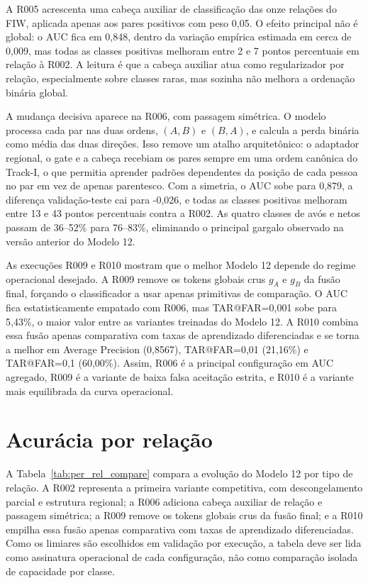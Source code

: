 A R005 acrescenta uma cabeça auxiliar de classificação das onze relações do FIW, aplicada apenas aos pares positivos com peso 0,05. O efeito principal não é global: o AUC fica em 0,848, dentro da variação empírica estimada em cerca de 0,009, mas todas as classes positivas melhoram entre 2 e 7 pontos percentuais em relação à R002. A leitura é que a cabeça auxiliar atua como regularizador por relação, especialmente sobre classes raras, mas sozinha não melhora a ordenação binária global.

A mudança decisiva aparece na R006, com passagem simétrica. O modelo processa cada par nas duas ordens, $(A,B)$ e $(B,A)$, e calcula a perda binária como média das duas direções. Isso remove um atalho arquitetônico: o adaptador regional, o gate e a cabeça recebiam os pares sempre em uma ordem canônica do Track-I, o que permitia aprender padrões dependentes da posição de cada pessoa no par em vez de apenas parentesco. Com a simetria, o AUC sobe para 0,879, a diferença validação-teste cai para -0,026, e todas as classes positivas melhoram entre 13 e 43 pontos percentuais contra a R002. As quatro classes de avós e netos passam de 36--52\% para 76--83\%, eliminando o principal gargalo observado na versão anterior do Modelo 12.

As execuções R009 e R010 mostram que o melhor Modelo 12 depende do regime operacional desejado. A R009 remove os tokens globais crus $g_A$ e $g_B$ da fusão final, forçando o classificador a usar apenas primitivas de comparação. O AUC fica estatisticamente empatado com R006, mas TAR@FAR=0,001 sobe para 5,43\%, o maior valor entre as variantes treinadas do Modelo 12. A R010 combina essa fusão apenas comparativa com taxas de aprendizado diferenciadas e se torna a melhor em Average Precision (0,8567), TAR@FAR=0,01 (21,16\%) e TAR@FAR=0,1 (60,00\%). Assim, R006 é a principal configuração em AUC agregado, R009 é a variante de baixa falsa aceitação estrita, e R010 é a variante mais equilibrada da curva operacional.

\section{Acurácia por relação}

A Tabela~\ref{tab:per_rel_compare} compara a evolução do Modelo 12 por tipo de relação. A R002 representa a primeira variante competitiva, com descongelamento parcial e estrutura regional; a R006 adiciona cabeça auxiliar de relação e passagem simétrica; a R009 remove os tokens globais crus da fusão final; e a R010 empilha essa fusão apenas comparativa com taxas de aprendizado diferenciadas. Como os limiares são escolhidos em validação por execução, a tabela deve ser lida como assinatura operacional de cada configuração, não como comparação isolada de capacidade por classe.

